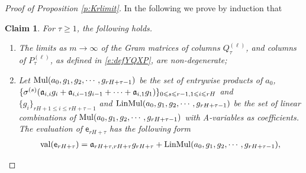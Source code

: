 \documentclass{article}
\numberwithin{equation}{section}
\newcommand{\fC}{{\mathtt C}}
\newcommand{\fa}{{\frak a}}
\newcommand{\sfe}{{\mathsf e}}
\DeclareMathOperator{\OO}{O}
\renewcommand{\leq}{\leqslant}
\renewcommand{\geq}{\geqslant}
\newcommand{\1}{\mathds{1}}
\theoremstyle{plain} %
\newtheorem{claim}[theorem]{Claim}
\newcommand{\val}{{\rm val}}
\newcommand{\LinMul}{{\rm LinMul}}
\newcommand{\Mul}{{\rm Mul}}
\begin{document}
\begin{proof}[Proof of Proposition \ref{p:Krlimit}]
In the following we prove by induction that
\begin{claim}\label{c:newtau}
For $\tau\geq 1$, the following holds.
\begin{enumerate}[{\rm (i)}]
\item
The limits as $m\rightarrow \infty$ of the Gram matrices of columns $Q_\tau^{(\ell)}$, and columns of $P_\tau^{(\ell)}$, as defined in \eqref{e:defYQXP}, are non-degenerate;
\item 
Let $\Mul(a_0, g_1,g_2,\cdots, g_{rH+\tau-1})$ be the set of entrywise products of 
$a_0$, $\{\sigma^{(s)}(\fa_{i,i}g_i+\fa_{i,i-1}g_{i-1}+\cdots+\fa_{i,1}g_1)\}_{0\leq s\leq r-1, 1\leq i\leq rH}$ and $\{g_i\}_{rH+1\leq i\leq rH+\tau-1}$ and $\LinMul(a_0, g_1,g_2,\cdots, g_{rH+\tau-1})$
be the set of linear combinations of $\Mul(a_0, g_1,g_2,\cdots, g_{rH+\tau-1})$ with A-variables as coefficients.
The evaluation of $\sfe_{rH+\tau}$ has the following form
\begin{align*}
\val(\sfe_{rH+\tau})=\fa_{rH+\tau,rH+\tau}g_{rH+\tau}+\LinMul(a_0, g_1,g_2,\cdots, g_{rH+\tau-1}),

\end{align*}
\end{enumerate}
\end{claim}
\end{proof}
\end{document}
